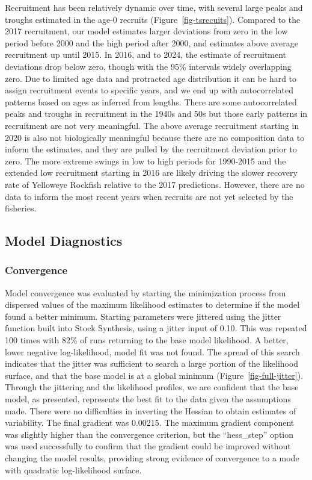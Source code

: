 \documentclass[
]{scrartcl}
\begin{document}
Recruitment has been relatively dynamic over time, with several large
peaks and troughs estimated in the age-0 recruits
(Figure~\ref{fig-tsrecuits}). Compared to the 2017 recruitment, our
model estimates larger deviations from zero in the low period before
2000 and the high period after 2000, and estimates above average
recruitment up until 2015. In 2016, and to 2024, the estimate of
recruitment deviations drop below zero, though with the 95\% intervals
widely overlapping zero. Due to limited age data and protracted age
distribution it can be hard to assign recruitment events to specific
years, and we end up with autocorrelated patterns based on ages as
inferred from lengths. There are some autocorrelated peaks and troughs
in recruitment in the 1940s and 50s but those early patterns in
recruitment are not very meaningful. The above average recruitment
starting in 2020 is also not biologically meaningful because there are
no composition data to inform the estimates, and they are pulled by the
recruitment deviation prior to zero. The more extreme swings in low to
high periods for 1990-2015 and the extended low recruitment starting in
2016 are likely driving the slower recovery rate of Yelloweye Rockfish
relative to the 2017 predictions. However, there are no data to inform
the most recent years when recruits are not yet selected by the
fisheries.

\subsection{Model Diagnostics}\label{model-diagnostics}

\subsubsection{Convergence}\label{convergence}

Model convergence was evaluated by starting the minimization process
from dispersed values of the maximum likelihood estimates to determine
if the model found a better minimum. Starting parameters were jittered
using the jitter function built into Stock Synthesis, using a jitter
input of 0.10. This was repeated 100 times with 82\% of runs returning
to the base model likelihood. A better, lower negative log-likelihood,
model fit was not found. The spread of this search indicates that the
jitter was sufficient to search a large portion of the likelihood
surface, and that the base model is at a global minimum
(Figure~\ref{fig-full-jitter}). Through the jittering and the likelihood
profiles, we are confident that the base model, as presented, represents
the best fit to the data given the assumptions made. There were no
difficulties in inverting the Hessian to obtain estimates of
variability. The final gradient was 0.00215. The maximum gradient
component was slightly higher than the convergence criterion, but the
``hess\_step'' option was used successfully to confirm that the gradient
could be improved without changing the model results, providing strong
evidence of convergence to a mode with quadratic log-likelihood surface.
\end{document}
